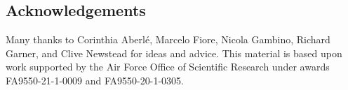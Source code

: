 \documentclass[12pt,reqno]{amsart}
\theoremstyle{remark}
\theoremstyle{definition}
\begin{document}
\subsection*{Acknowledgements}

Many thanks to Corinthia Aberl\'e, Marcelo Fiore, Nicola Gambino, Richard Garner, and Clive Newstead for ideas and advice.  This material is based upon work supported by the Air Force Office of Scientific Research under awards FA9550-21-1-0009 and FA9550-20-1-0305.




\end{document}
